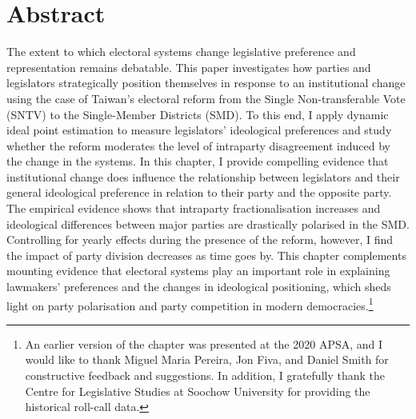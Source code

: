 
\section*{\centering Abstract}
\small The extent to which electoral systems change legislative preference and representation remains debatable. This paper investigates how parties and legislators strategically position themselves in response to an institutional change using the case of Taiwan's electoral reform from the Single Non-transferable Vote (SNTV) to the Single-Member Districts (SMD). To this end, I apply dynamic ideal point estimation to measure legislators' ideological preferences and study whether the reform moderates the level of intraparty disagreement induced by the change in the systems. In this chapter, I provide compelling evidence that institutional change does influence the relationship between legislators and their general ideological preference in relation to their party and the opposite party. The empirical evidence shows that intraparty fractionalisation increases and ideological differences between major parties are drastically polarised in the SMD. Controlling for yearly effects during the presence of the reform, however, I find the impact of party division decreases as time goes by. This chapter complements mounting evidence that electoral systems play an important role in explaining lawmakers' preferences and the changes in ideological positioning, which sheds light on party polarisation and party competition in modern democracies.\footnote{An earlier version of the chapter was presented at the 2020 APSA, and I would like to thank Miguel Maria Pereira, Jon Fiva, and Daniel Smith for constructive feedback and suggestions. In addition, I gratefully thank the Centre for Legislative Studies at Soochow University for providing the historical roll-call data.}

\clearpage

